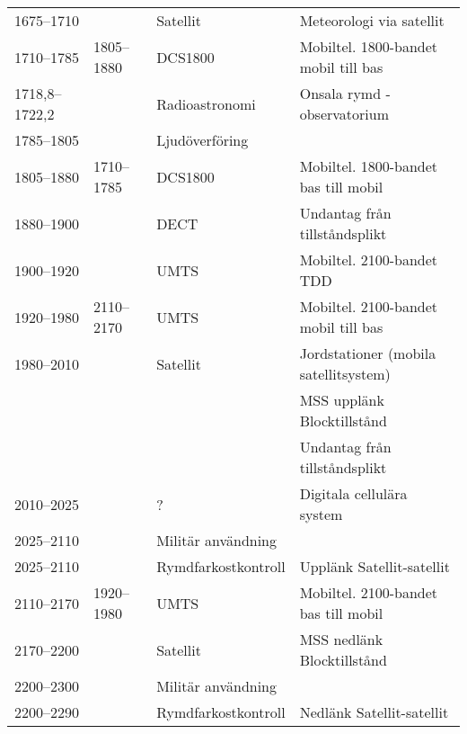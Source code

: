 \begin{landscape}
\begin{longtable}{llll}
	1675--1710         &                    & Satellit                & Meteorologi via satellit              \\
	1710--1785         & 1805--1880         & DCS1800                 & Mobiltel. 1800-bandet mobil till bas  \\
	1718,8--1722,2     &                    & Radioastronomi          & Onsala rymd - observatorium           \\
	1785--1805         &                    & Ljudöverföring          &                                       \\
	1805--1880         & 1710--1785         & DCS1800                 & Mobiltel. 1800-bandet bas till mobil  \\
	1880--1900         &                    & DECT                    & Undantag från tillståndsplikt         \\
	1900--1920         &                    & UMTS                    & Mobiltel. 2100-bandet TDD             \\
	1920--1980         & 2110--2170         & UMTS                    & Mobiltel. 2100-bandet mobil till bas  \\
	1980--2010         &                    & Satellit                & Jordstationer (mobila satellitsystem) \\
	                   &                    &                         & MSS upplänk Blocktillstånd            \\
	                   &                    &                         & Undantag från tillståndsplikt         \\
	2010--2025         &                    & ?                       & Digitala cellulära system             \\
	2025--2110         &                    & Militär användning      &                                       \\
	2025--2110         &                    & Rymdfarkostkontroll     & Upplänk Satellit-satellit             \\
	2110--2170         & 1920--1980         & UMTS                    & Mobiltel. 2100-bandet bas till mobil  \\
	2170--2200         &                    & Satellit                & MSS nedlänk Blocktillstånd            \\
	2200--2300         &                    & Militär användning      &                                       \\
	2200--2290         &                    & Rymdfarkostkontroll     & Nedlänk Satellit-satellit             \\

\end{longtable}
\end{landscape}
